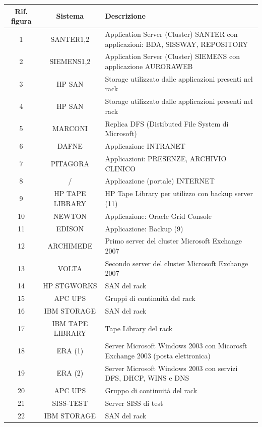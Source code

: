 \documentclass[12pt, a4paper, titlepage]{report}
\begin{document}
		\begin{longtable}{| c | c | p{6cm} |}
				\hline
				\textbf{Rif. figura} & \textbf{Sistema} & \textbf{Descrizione} \\ \hline
				1 & SANTER{1,2} & Application Server (Cluster) SANTER con applicazioni: BDA, SISSWAY, REPOSITORY \\ \hline
				2 & SIEMENS{1,2} & Application Server (Cluster) SIEMENS con applicazione AURORAWEB \\ \hline
				3 & HP SAN & Storage utilizzato dalle applicazioni presenti nel rack \\ \hline
				4 & HP SAN & Storage utilizzato dalle applicazioni presenti nel rack  \\ \hline
				5 & MARCONI & Replica DFS (Distibuted File System di Microsoft) \\ \hline
				6 & DAFNE & Applicazione INTRANET \\ \hline
				7 & PITAGORA & Applicazioni: PRESENZE, ARCHIVIO CLINICO \\ \hline
				8 & / & Applicazione (portale) INTERNET \\ \hline
				9 & HP TAPE LIBRARY & HP Tape Library per utilizzo con backup server (11) \\ \hline
				10 & NEWTON & Applicazione: Oracle Grid Console \\ \hline
				11 & EDISON & Applicazione: Backup (9) \\ \hline
				12 & ARCHIMEDE & Primo server del cluster Microsoft Exchange 2007 \\ \hline
				13 & VOLTA & Secondo server del cluster Microsoft Exchange 2007 \\ \hline
				14 & HP STGWORKS & SAN del rack \\ \hline
				15 & APC UPS & Gruppi di continuità del rack \\ \hline
				16 & IBM STORAGE & SAN del rack \\ \hline
				17 & IBM TAPE LIBRARY & Tape Library del rack \\ \hline
				18 & ERA (1) & Server Microsoft Windows 2003 con Micorosft
Exchange 2003 (posta elettronica) \\ \hline
				19 & ERA (2) & Server Microsoft Windows 2003 con servizi DFS,
DHCP, WINS e DNS \\ \hline
				20 & APC UPS & Gruppo di continuità del rack \\ \hline
				21 & SISS-TEST & Server SISS di test \\ \hline
				22 & IBM STORAGE & SAN del rack \\ \hline

\end{longtable}
\end{document}
